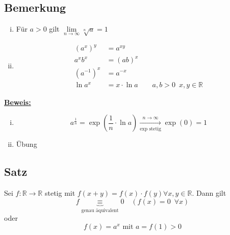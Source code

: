 \subsection{Bemerkung} %
\label{sub:bemerkung}
\begin{enumerate}[(i)]
	\item Für $a>0$ gilt $\lim\limits_{n \to \infty} \sqrt[n]{a}=1$
	\item \begin{align*}
		(a^x)^y &= a^{xy} \\
		a^x b^x &= (ab)^x \\
		(a^{-1})^x &= a^{-x} \\
		\ln a^x &= x \cdot \ln a \qquad a,b>0 \enspace x,y \in \mathds{R}
	\end{align*}
\end{enumerate}
\underline{\textbf{Beweis:}} \\
\begin{enumerate}[(i)]
	\item
	\[
		a^{\frac{1}{n} }  =\exp \left( \frac{1}{n} \cdot \ln a \right) \underset{\exp \text{ stetig}}{\xrightarrow{n \to \infty}} \exp (0) = 1
	\]
	\item Übung
\end{enumerate}

\subsection{Satz} %
\label{sub:satz}
Sei $f: \mathds{R} \to \mathds{R}$ stetig mit $f(x+y)=f(x) \cdot f(y) \forall x,y \in \mathds{R}$. Dann gilt 
\[
	f \underbrace{\equiv}_{\text{genau äquivalent}} 0 \quad \left(f(x)=0 \enspace \forall x\right) 
\]
oder
\[
	f(x)=a^x \text{ mit } a=f(1)>0
\]

